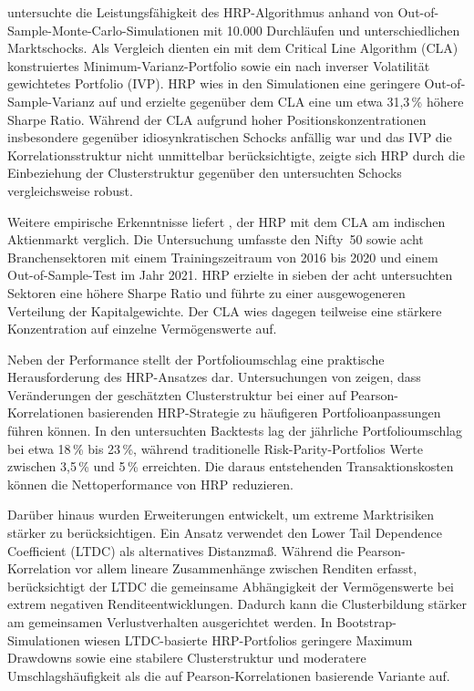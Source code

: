 \documentclass[a4paper, 12pt]{article}
\begin{document}
\textcite{deprado2016} untersuchte die Leistungsfähigkeit des HRP-Algorithmus anhand von Out-of-Sample-Monte-Carlo-Simulationen mit 10.000 Durchläufen und unterschiedlichen Marktschocks.
Als Vergleich dienten ein mit dem Critical Line Algorithm (CLA) konstruiertes Minimum-Varianz-Portfolio sowie ein nach inverser Volatilität gewichtetes Portfolio (IVP).
HRP wies in den Simulationen eine geringere Out-of-Sample-Varianz auf und erzielte gegenüber dem CLA eine um etwa 31,3\,\% höhere Sharpe Ratio.
Während der CLA aufgrund hoher Positionskonzentrationen insbesondere gegenüber idiosynkratischen Schocks anfällig war und das IVP die Korrelationsstruktur nicht unmittelbar berücksichtigte, zeigte sich HRP durch die Einbeziehung der Clusterstruktur gegenüber den untersuchten Schocks vergleichsweise robust.

Weitere empirische Erkenntnisse liefert \textcite{sen2022}, der HRP mit dem CLA am indischen Aktienmarkt verglich.
Die Untersuchung umfasste den Nifty~50 sowie acht Branchensektoren mit einem Trainingszeitraum von 2016 bis 2020 und einem Out-of-Sample-Test im Jahr 2021.
HRP erzielte in sieben der acht untersuchten Sektoren eine höhere Sharpe Ratio und führte zu einer ausgewogeneren Verteilung der Kapitalgewichte.
Der CLA wies dagegen teilweise eine stärkere Konzentration auf einzelne Vermögenswerte auf.

Neben der Performance stellt der Portfolioumschlag eine praktische Herausforderung des HRP-Ansatzes dar.
Untersuchungen von \textcite{lohre2020} zeigen, dass Veränderungen der geschätzten Clusterstruktur bei einer auf Pearson-Korrelationen basierenden HRP-Strategie zu häufigeren Portfolioanpassungen führen können.
In den untersuchten Backtests lag der jährliche Portfolioumschlag bei etwa 18\,\% bis 23\,\%, während traditionelle Risk-Parity-Portfolios Werte zwischen 3,5\,\% und 5\,\% erreichten.
Die daraus entstehenden Transaktionskosten können die Nettoperformance von HRP reduzieren.

Darüber hinaus wurden Erweiterungen entwickelt, um extreme Marktrisiken stärker zu berücksichtigen.
Ein Ansatz verwendet den Lower Tail Dependence Coefficient (LTDC) als alternatives Distanzmaß.
Während die Pearson-Korrelation vor allem lineare Zusammenhänge zwischen Renditen erfasst, berücksichtigt der LTDC die gemeinsame Abhängigkeit der Vermögenswerte bei extrem negativen Renditeentwicklungen.
Dadurch kann die Clusterbildung stärker am gemeinsamen Verlustverhalten ausgerichtet werden.
In Bootstrap-Simulationen wiesen LTDC-basierte HRP-Portfolios geringere Maximum Drawdowns sowie eine stabilere Clusterstruktur und moderatere Umschlagshäufigkeit als die auf Pearson-Korrelationen basierende Variante auf.
\end{document}
